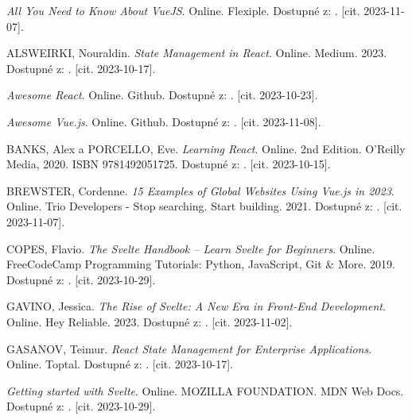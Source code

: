 

\begin{thebibliography}{99}\radkovani[1.2]\raggedright
\label{chap:literatura}

\emph{All You Need to Know About VueJS}. Online. Flexiple. Dostupné z: . [cit. 2023-11-07].

\textsc{ALSWEIRKI}, Nouraldin. \emph{State Management in React}. Online. Medium. 2023. Dostupné z: . [cit. 2023-10-17].

\emph{Awesome React}. Online. Github. Dostupné z: . [cit. 2023-10-23].

\emph{Awesome Vue.js}. Online. Github. Dostupné z: . [cit. 2023-11-08].

\textsc{BANKS}, Alex a \textsc{PORCELLO}, Eve. \emph{Learning React}. Online. 2nd Edition. O'Reilly Media, 2020. ISBN 9781492051725. Dostupné z: . [cit. 2023-10-15].

\textsc{BREWSTER}, Cordenne. \emph{15 Examples of Global Websites Using Vue.js in 2023}. Online. Trio Developers - Stop searching. Start building. 2021. Dostupné z: . [cit. 2023-11-07].

\textsc{COPES}, Flavio. \emph{The Svelte Handbook -- Learn Svelte for Beginners}. Online. FreeCodeCamp Programming Tutorials: Python, JavaScript, Git \& More. 2019. Dostupné z: . [cit. 2023-10-29].

\textsc{GAVINO}, Jessica. \emph{The Rise of Svelte: A New Era in Front-End Development}. Online. Hey Reliable. 2023. Dostupné z: . [cit. 2023-11-02].

\textsc{GASANOV}, Teimur. \emph{React State Management for Enterprise Applications}. Online. Toptal. Dostupné z: . [cit. 2023-10-17].

\emph{Getting started with Svelte}. Online. MOZILLA FOUNDATION. MDN Web Docs. Dostupné z: . [cit. 2023-10-29].


\end{thebibliography}
